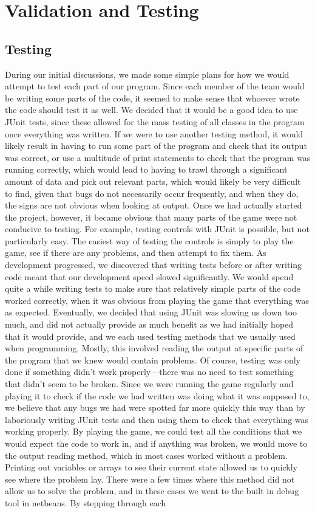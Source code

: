 \chapter{Validation and Testing}
\label{cha:validation}
\section{Testing}
During our initial discussions, we made some simple plans for how we would attempt to test each part of our program. Since each member of the team would be writing some parts of the code, it seemed to make sense that whoever wrote the code should test it as well. We decided that it would be a good idea to use JUnit tests, since these allowed for the mass testing of all classes in the program once everything was written. If we were to use another testing method, it would likely result in having to run some part of the program and check that its output was correct, or use a multitude of print statements to check that the program was running correctly, which would lead to having to trawl through a significant amount of data and pick out relevant parts, which would likely be very difficult to find, given that bugs do not necessarily occur frequently, and when they do, the signs are not obvious when looking at output. Once we had actually started the project, however, it became obvious that many parts of the game were not conducive to testing. For example, testing controls with JUnit is possible, but not particularly easy. The easiest way of testing the controls is simply to play the game, see if there are any problems, and then attempt to fix them. As development progressed, we discovered that writing tests before or after writing code meant that our development speed slowed significantly. We would spend quite a while writing tests to make sure that relatively simple parts of the code worked correctly, when it was obvious from playing the game that everything was as expected. Eventually, we decided that using JUnit was slowing us down too much, and did not actually provide as much benefit as we had initially hoped that it would provide, and we each used testing methods that we usually used when programming. Mostly, this involved reading the output at specific parts of the program that we knew would contain problems. Of course, testing was only done if something didn't work properly---there was no need to test something that didn't seem to be broken. Since we were running the game regularly and playing it to check if the code we had written was doing what it was supposed to, we believe that any bugs we had were spotted far more quickly this way than by laboriously writing JUnit tests and then using them to check that everything was working properly. By playing the game, we could test all the conditions that we would expect the code to work in, and if anything was broken, we would move to the output reading method, which in most cases worked without a problem. Printing out variables or arrays to see their current state allowed us to quickly see where the problem lay. There were a few times where this method did not allow us to solve the problem, and in these cases we went to the built in debug tool in netbeans. By stepping through each 